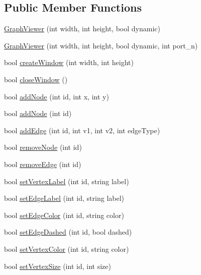 \subsection*{Public Member Functions}
\begin{DoxyCompactItemize}
\item 
\hyperlink{class_graph_viewer_a8adc614f4fc290a3efcec7d7ceb1c58a}{Graph\+Viewer} (int width, int height, bool dynamic)
\item 
\hyperlink{class_graph_viewer_ad9d7b1d8b4ba8ef18517eae0e68568a2}{Graph\+Viewer} (int width, int height, bool dynamic, int port\+\_\+n)
\item 
bool \hyperlink{class_graph_viewer_ae5247dc66449dcd21fc5d531bbbaddfa}{create\+Window} (int width, int height)
\item 
bool \hyperlink{class_graph_viewer_a85990c1eaac7feed3950960d4bd2fd4c}{close\+Window} ()
\item 
bool \hyperlink{class_graph_viewer_a5421e86ac76433876309236ba96e70a2}{add\+Node} (int id, int x, int y)
\item 
bool \hyperlink{class_graph_viewer_ab9be856eb5f45284719a3bb119ec01ea}{add\+Node} (int id)
\item 
bool \hyperlink{class_graph_viewer_aad0c1448c37f744209ffb671f1bd0015}{add\+Edge} (int id, int v1, int v2, int edge\+Type)
\item 
bool \hyperlink{class_graph_viewer_a0c418639bb911eb827cabf895915f775}{remove\+Node} (int id)
\item 
bool \hyperlink{class_graph_viewer_a9a8ee68c7c12b373affbe4069dd95d72}{remove\+Edge} (int id)
\item 
bool \hyperlink{class_graph_viewer_ac25d7d007022fda16799808ba136e909}{set\+Vertex\+Label} (int id, string label)
\item 
bool \hyperlink{class_graph_viewer_a447cca0064e785654c2105602c2961ca}{set\+Edge\+Label} (int id, string label)
\item 
bool \hyperlink{class_graph_viewer_a07ccc96707efae4aa5f3ced3dca015af}{set\+Edge\+Color} (int id, string color)
\item 
bool \hyperlink{class_graph_viewer_a1698f1c6b3a8e7cabc7b7d7cf42fc7f0}{set\+Edge\+Dashed} (int id, bool dashed)
\item 
bool \hyperlink{class_graph_viewer_a8b542d7e09e81a45a74760c19233beb0}{set\+Vertex\+Color} (int id, string color)
\item 
bool \hyperlink{class_graph_viewer_ae930dfdfcdeb7a871eefb6028d74b9f9}{set\+Vertex\+Size} (int id, int size)
\item 

\end{DoxyCompactItemize}
